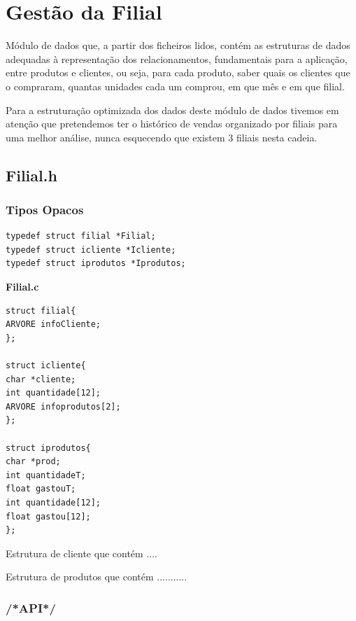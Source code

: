 \section{Gestão da Filial}

Módulo de dados que, a partir dos ficheiros lidos, contém as estruturas de dados adequadas à representação dos relacionamentos, fundamentais para a aplicação, entre produtos e clientes, ou seja, para cada produto, saber quais os clientes que o compraram, quantas unidades cada um comprou, em que mês e em que filial.

 Para a estruturação optimizada dos dados deste módulo de dados tivemos em atenção que pretendemos ter o histórico de vendas organizado por filiais para uma melhor análise, nunca esquecendo que existem 3 filiais nesta cadeia. 

\subsection{Filial.h}

\subsubsection{Tipos Opacos}
\begin{Verbatim}
typedef struct filial *Filial;
typedef struct icliente *Icliente;
typedef struct iprodutos *Iprodutos;
\end{Verbatim}

\textbf{Filial.c}
\begin{verbatim}
struct filial{
ARVORE infoCliente;
};

struct icliente{
char *cliente;
int quantidade[12];
ARVORE infoprodutos[2];
};

struct iprodutos{
char *prod;
int quantidadeT;
float gastouT;
int quantidade[12];
float gastou[12];
};
\end{verbatim}

Estrutura de cliente que contém .... 

Estrutura de produtos que contém ...........


\subsubsection{/*API*/}

